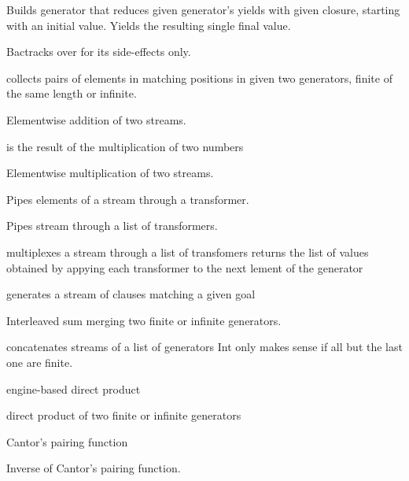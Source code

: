 \documentclass[11pt]{article}
\begin{document}
\begin{description}
Builds generator that reduces given generator's yields with given closure,
starting with an initial value. Yields the resulting single final value.

Bactracks over  for its side-effects only. 

 collects pairs of elements in matching positions
in given two generators, finite of the same length or infinite.

Elementwise addition of two streams.

 is the result of the multiplication of two numbers

Elementwise multiplication of two streams.

Pipes elements of a stream through a transformer.

Pipes stream through a list of transformers.

multiplexes a stream through a list of transfomers
returns the list of values obtained by appying each
transformer to the next lement of the generator

generates a stream of clauses matching a given goal

Interleaved sum merging two finite or infinite generators.

concatenates streams of a list of generators
Int only makes sense if all but the last one are finite.

engine-based direct product

direct product of two finite or infinite generators

Cantor's pairing function

Inverse of Cantor's pairing function.


\end{description}
\end{document}
